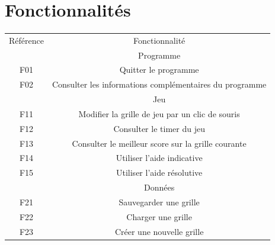 

\section{Fonctionnalités}
	\paragraph*{}
        \begin{tabular*}{0.75\textwidth}{ c | c }
		Référence & Fonctionnalité\\
		& Programme \\ 
		F01 & Quitter le programme \\
		F02 & Consulter les informations complémentaires du programme \\
		& Jeu \\ 
		F11 & Modifier la grille de jeu par un clic de souris \\
		F12 & Consulter le timer du jeu \\
		F13 & Consulter le meilleur score sur la grille courante \\
		F14 & Utiliser l'aide indicative \\
		F15 & Utiliser l'aide résolutive \\
		& Données \\ 
		F21 & Sauvegarder une grille \\
		F22 & Charger une grille \\
		F23 & Créer une nouvelle grille \\ %
        \end{tabular*}

